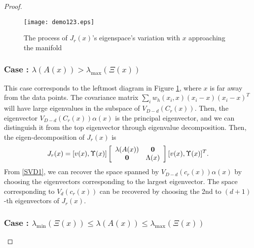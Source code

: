 \documentclass[aos,preprint]{imsart}
\theoremstyle{remark}
\begin{document}
\begin{appendix}
\begin{proof}
\begin{figure}[t] %
\texttt{[image: demo123.eps]} 
\caption{The process of $J_r(x)$'s eigenspace's variation with $x$ approaching the manifold }
\label{Shifting Eigenvectors}
\end{figure}

\subsubsection*{Case : $\lambda(A(x))>\lambda_{\max} (\Xi(x))$}

This case corresponds to the leftmost diagram in {Figure \ref{Shifting Eigenvectors}}, where $x$ is far away from the data points. The covariance matrix $\sum_i w_h(x_i, x)(x_i-x)(x_i-x)^T$ will have large eigenvalues in the subspace of $V_{D-d}(C_r(x))$. Then, the eigenvector $V_{D-d}(C_r(x))\alpha(x)$ is the principal eigenvector, and we can distinguish it from the top eigenvector through eigenvalue decomposition.
Then, the eigen-decomposition of $J_r(x)$ is
\begin{equation}\label{SVD1}
J_r (x)= [v(x), \Upsilon(x)] 
\left[
\begin{array}{cc}
\lambda(A(x)) & \bf 0\\
\bf 0 &\Lambda(x)
\end{array}
\right][v(x), \Upsilon(x)]^T.
\end{equation}
From \eqref{SVD1}, we can recover the space spanned by $V_{D-d}(c_r(x))\alpha(x)$ by choosing the eigenvectors corresponding to the largest eigenvector. The space corresponding to $V_d(c_r(x))$ can be recovered by choosing the 2nd to $(d+1)$-th eigenvectors of $J_r(x)$.

\subsubsection*{Case : $\lambda_{\min} (\Xi(x)) \leq \lambda(A(x))\leq \lambda_{\max} (\Xi(x))$}


\end{proof}
\end{appendix}
\end{document}
